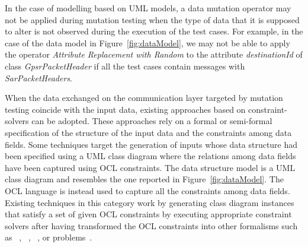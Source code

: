In the case of modelling based on UML models, a data mutation operator may not be applied during mutation testing when the type of data that it is supposed to alter is not observed during the execution of the test cases. 
For example, in the case of the data model in Figure~\ref{fig:dataModel}, we may not be able to apply the operator \emph{Attribute Replacement with Random} to the attribute \emph{destinationId} of class \emph{GpsrPacketHeader} if all the test cases contain messages with \emph{SarPacketHeaders}.



When the data exchanged on the communication layer targeted by mutation testing coincide with the input data, existing approaches based on constraint-solvers can be adopted. 
These approaches rely on a formal or semi-formal specification of the structure of the input data and the constraints among data fields.
Some techniques target the generation of inputs whose data structure had been specified using a UML class diagram where the relations among data fields have been captured using OCL constraints. The data structure model is a UML class diagram and resembles the one reported in Figure~\ref{fig:dataModel}. The OCL language is instead used to capture all the constraints among data fields. Existing techniques in this category work by generating class diagram instances that satisfy a set of given OCL constraints by executing appropriate constraint solvers after having transformed the OCL constraints into other formalisms such as ~\cite{Uml2alloy}, ~\cite{EMFTOCSP}, ~\cite{Przigoda2016}, or  problems~\cite{Soeken2011}. 

